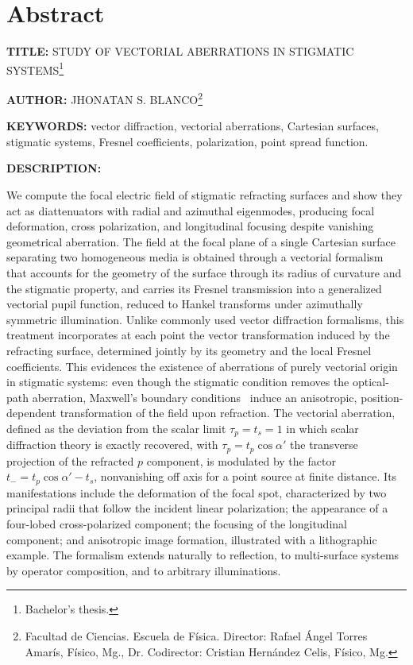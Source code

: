 \clearpage
\chapter*{Abstract}

\noindent\textbf{TITLE:} STUDY OF VECTORIAL ABERRATIONS IN STIGMATIC
SYSTEMS\footnote{Bachelor's thesis.}

\vspace{0.5em}
\noindent\textbf{AUTHOR:} JHONATAN S. BLANCO\footnote{Facultad de Ciencias.
Escuela de Física. Director: Rafael Ángel Torres Amarís, Físico, Mg., Dr.
Codirector: Cristian Hernández Celis, Físico, Mg.}

\vspace{0.5em}
\noindent\textbf{KEYWORDS:} vector diffraction, vectorial aberrations,
Cartesian surfaces, stigmatic systems, Fresnel coefficients, polarization,
point spread function.

\vspace{0.5em}
\noindent\textbf{DESCRIPTION:}

We compute the focal electric field of stigmatic refracting surfaces and show
they act as diattenuators with radial and azimuthal eigenmodes, producing
focal deformation, cross polarization, and longitudinal focusing despite
vanishing geometrical aberration. The field at the focal plane of a single
Cartesian surface separating two homogeneous media is obtained through a
vectorial formalism that accounts for the geometry of the surface through its
radius of curvature and the stigmatic property, and carries its Fresnel
transmission into a generalized vectorial pupil function, reduced to Hankel
transforms under azimuthally symmetric illumination. Unlike commonly used
vector diffraction formalisms, this treatment incorporates at each point the
vector transformation induced by the refracting surface, determined jointly
by its geometry and the local Fresnel coefficients. This evidences the
existence of aberrations of purely vectorial origin in stigmatic systems:
even though the stigmatic condition removes the optical-path aberration,
Maxwell's boundary conditions~\cite{jackson1999} induce an anisotropic, position-dependent
transformation of the field upon refraction. The vectorial aberration,
defined as the deviation from the scalar limit $\tau_p=t_s=1$ in which scalar
diffraction theory is exactly recovered, with $\tau_p=t_p\cos\alpha'$ the
transverse projection of the refracted $p$ component, is modulated by the
factor $t_-=t_p\cos\alpha'-t_s$, nonvanishing off axis for a point source at
finite distance. Its manifestations include the deformation of the focal
spot, characterized by two principal radii that follow the incident linear
polarization; the appearance of a four-lobed cross-polarized component; the
focusing of the longitudinal component; and anisotropic image formation,
illustrated with a lithographic example. The formalism extends naturally to
reflection, to multi-surface systems by operator composition, and to
arbitrary illuminations.
